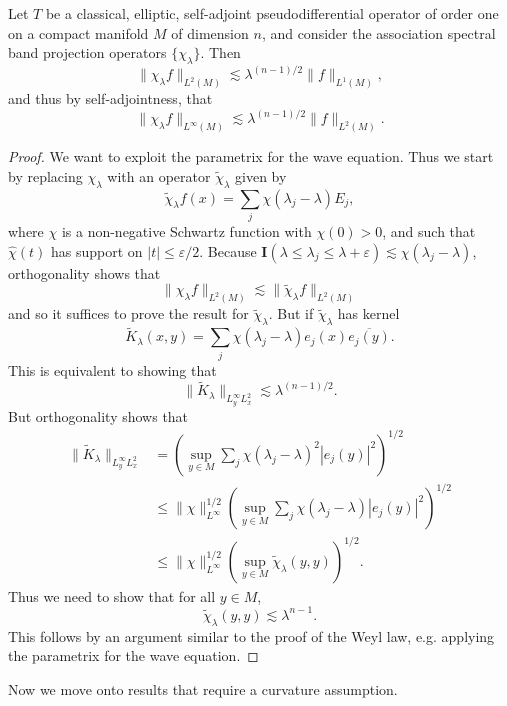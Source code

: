 \begin{lemma}
    Let $T$ be a classical, elliptic, self-adjoint pseudodifferential operator of order one on a compact manifold $M$ of dimension $n$, and consider the association spectral band projection operators $\{ \chi_\lambda \}$. Then
    \[ \| \chi_\lambda f \|_{L^2(M)} \lesssim \lambda^{(n-1)/2} \| f \|_{L^1(M)}, \]
    and thus by self-adjointness, that
    \[ \| \chi_\lambda f \|_{L^\infty(M)} \lesssim \lambda^{(n-1)/2} \| f \|_{L^2(M)}. \]
\end{lemma}
\begin{proof}
    We want to exploit the parametrix for the wave equation. Thus we start by replacing $\chi_\lambda$ with an operator $\tilde{\chi}_\lambda$ given by
    \[ \tilde{\chi}_\lambda f(x) = \sum_j \chi(\lambda_j - \lambda) E_j, \]
    where $\chi$ is a non-negative Schwartz function with $\chi(0) > 0$, and such that $\widehat{\chi}(t)$ has support on $|t| \leq \varepsilon/2$. Because $\mathbf{I}(\lambda \leq \lambda_j \leq \lambda + \varepsilon) \lesssim \chi(\lambda_j - \lambda)$, orthogonality shows that
    \[ \| \chi_\lambda f \|_{L^2(M)} \lesssim \| \tilde{\chi}_\lambda f \|_{L^2(M)} \]
    and so it suffices to prove the result for $\tilde{\chi}_\lambda$. But if $\tilde{\chi}_\lambda$ has kernel
    \[ \tilde{K}_\lambda(x,y) = \sum_j \chi(\lambda_j - \lambda) e_j(x) \overline{e_j(y)}. \]
    This is equivalent to showing that
    \[ \| \tilde{K}_\lambda \|_{L^\infty_y L^2_x} \lesssim \lambda^{(n-1)/2}. \]
    But orthogonality shows that
    \begin{align*}
        \| \tilde{K}_\lambda \|_{L^\infty_y L^2_x} &= \left( \sup_{y \in M} \sum_j \chi(\lambda_j - \lambda)^2 |e_j(y)|^2 \right)^{1/2}\\
        &\leq \| \chi \|_{L^\infty}^{1/2} \left( \sup_{y \in M} \sum_j \chi(\lambda_j - \lambda) |e_j(y)|^2 \right)^{1/2}\\
        &\leq \| \chi \|_{L^\infty}^{1/2} \left( \sup_{y \in M} \tilde{\chi}_\lambda(y,y) \right)^{1/2}.
    \end{align*}
    Thus we need to show that for all $y \in M$,
    \[ \tilde{\chi}_\lambda(y,y) \lesssim \lambda^{n-1}. \]
    This follows by an argument similar to the proof of the Weyl law, e.g. applying the parametrix for the wave equation.
\end{proof}

Now we move onto results that require a curvature assumption.


